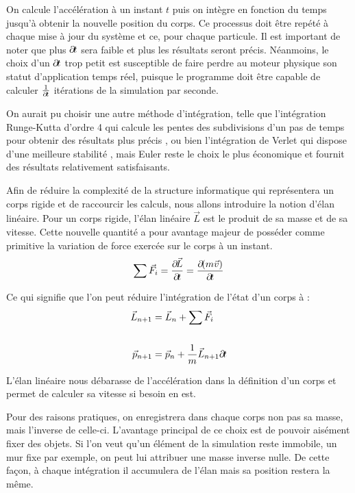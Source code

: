 On calcule l'accélération à un instant $t$ puis on intègre en fonction
du temps jusqu'à obtenir la nouvelle position du corps. Ce processus
doit être repété à chaque mise à jour du système et ce, pour chaque
particule. Il est important de noter que plus $\partial \! t$ sera faible
et plus les résultats seront précis. Néanmoins, le choix d'un $\partial \!
t$ trop petit est susceptible de faire perdre au moteur physique son
statut d'application temps réel, puisque le programme doit être
capable de calculer $\frac{1}{\partial \! t}$ itérations de la simulation
par seconde.

On aurait pu choisir une autre méthode d'intégration, telle que
l'intégration Runge-Kutta d'ordre 4 qui calcule les pentes des
subdivisions d'un pas de temps pour obtenir des résultats plus précis
\cite{fiedler}, ou bien l'intégration de Verlet qui dispose d'une
meilleure stabilité \cite{bitterli}, mais Euler reste le choix le plus
économique et fournit des résultats relativement satisfaisants.

Afin de réduire la complexité de la structure informatique qui
représentera un corps rigide et de raccourcir les calculs, nous allons
introduire la notion d'élan linéaire. Pour un corps rigide, l'élan
linéaire $\vec{L}$ est le produit de sa masse et de sa vitesse. Cette
nouvelle quantité a pour avantage majeur de posséder comme primitive
la variation de force exercée sur le corps à un instant.
\begin{align*}
  {\sum \vec{F}_i} = \frac{\partial \! \vec{L}}{\partial \! t} = \frac{\partial \! (m\vec{v})}{\partial \! t}
\end{align*}

Ce qui signifie que l'on peut réduire l'intégration de l'état d'un
corps à :
\begin{align*}
  \vec{L}_{n+1} &= \vec{L}_n + {\sum \vec{F}_i} \\ \\
  \vec{p}_{n+1} &= \vec{p}_n + \frac{1}{m}\vec{L}_{n+1} \partial \! t
\end{align*}

L'élan linéaire nous débarasse de l'accélération dans la définition
d'un corps et permet de calculer sa vitesse si besoin en est.

Pour des raisons pratiques, on enregistrera dans chaque corps non pas
sa masse, mais l'inverse de celle-ci. L'avantage principal de ce choix
est de pouvoir aisément fixer des objets. Si l'on veut qu'un élément
de la simulation reste immobile, un mur fixe par exemple, on peut lui
attribuer une masse inverse nulle. De cette façon, à chaque
intégration il accumulera de l'élan mais sa position restera la même.

